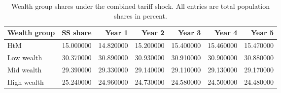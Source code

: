 \begin{table}
\caption{Wealth group shares under the combined tariff shock. All entries are total population shares in percent.}
\label{tab:wealth_group_shares_tau_war}
\begin{tabular}{lrrrrrr}
\toprule
Wealth group & SS share & Year 1 & Year 2 & Year 3 & Year 4 & Year 5 \\
\midrule
HtM & 15.000000 & 14.820000 & 15.200000 & 15.400000 & 15.460000 & 15.470000 \\
Low wealth & 30.370000 & 30.890000 & 30.930000 & 30.910000 & 30.900000 & 30.880000 \\
Mid wealth & 29.390000 & 29.330000 & 29.140000 & 29.110000 & 29.130000 & 29.170000 \\
High wealth & 25.240000 & 24.960000 & 24.730000 & 24.580000 & 24.500000 & 24.480000 \\
\bottomrule
\end{tabular}
\end{table}
